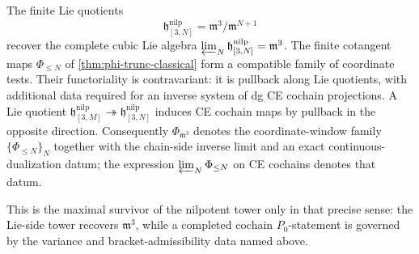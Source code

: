 \begin{prop}
\label{prop:colim-recovery}
The finite Lie quotients
\[
  \mathfrak h^{\mathrm{nilp}}_{[3,N]}=\mathfrak m^3/\mathfrak m^{N+1}
\]
recover the complete cubic Lie algebra
\(\varprojlim_N\mathfrak h^{\mathrm{nilp}}_{[3,N]}=\mathfrak m^3\).  The finite
cotangent maps \(\Phi_{\leq N}\) of
\ref{thm:phi-trunc-classical} form a compatible family of coordinate
tests.  Their functoriality is contravariant: it is pullback along Lie
quotients, with additional data required for an inverse system of dg CE
cochain projections.  A Lie quotient
\(\mathfrak h^{\mathrm{nilp}}_{[3,M]}\twoheadrightarrow\mathfrak h^{\mathrm{nilp}}_{[3,N]}\) induces CE
cochain maps by pullback in the opposite direction.  Consequently
\(\Phi_{\mathfrak m^3}\) denotes the coordinate-window family
\(\{\Phi_{\leq N}\}_N\) together with the chain-side inverse limit and an
exact continuous-dualization datum; the expression
\(\varprojlim_N\Phi_{\leq N}\) on CE cochains denotes that datum.

This is the maximal survivor of the nilpotent tower only in that precise
sense: the Lie-side tower recovers \(\mathfrak m^3\), while a completed
cochain \(P_0\)-statement is governed by the variance and
bracket-admissibility data named above.
\end{prop}

